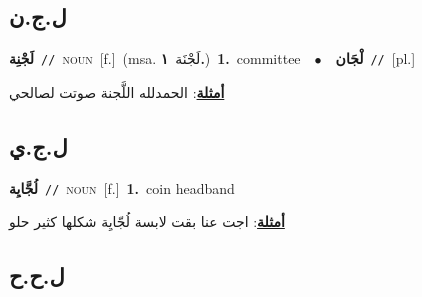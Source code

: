 \documentclass[10pt,a4paper,twoside]{article} %
\begin{document}
\begin{multicols}{2}
{{{{{{{{{{{{{{{{\vspace{-3mm}
\subsection*{\color{blue}\foreignlanguage{arabic}{ل.ج.ن}\color{blue}{}} 

{\setlength\topsep{0pt}\textbf{\foreignlanguage{arabic}{لَجْنِة}}\ {\color{gray}\texttt{//}\color{black}}\ \textsc{noun}\ [f.]\ \color{gray}(msa. \foreignlanguage{arabic}{لَجْنَة}~\foreignlanguage{arabic}{\textbf{١.}})\color{black}\ \textbf{1.}~committee\ \ $\bullet$\ \ \setlength\topsep{0pt}\textbf{\foreignlanguage{arabic}{لْجَان}}\ {\color{gray}\texttt{//}\color{black}}\ [pl.]\  \begin{flushright}\color{gray}\foreignlanguage{arabic}{\textbf{\underline{\foreignlanguage{arabic}{أمثلة}}}: الحمدلله اللَّجنة صوتت لصالحي}\end{flushright}\color{black}} \vspace{2mm}

\vspace{-3mm}
\subsection*{\color{blue}\foreignlanguage{arabic}{ل.ج.ي}\color{blue}{}} 

{\setlength\topsep{0pt}\textbf{\foreignlanguage{arabic}{لُجَّايِة}}\ {\color{gray}\texttt{//}\color{black}}\ \textsc{noun}\ [f.]\ \textbf{1.}~coin headband\  \begin{flushright}\color{gray}\foreignlanguage{arabic}{\textbf{\underline{\foreignlanguage{arabic}{أمثلة}}}: اجت عنا بقت لابسة لُجّايِة شكلها كثير حلو}\end{flushright}\color{black}} \vspace{2mm}

\vspace{-3mm}
\subsection*{\color{blue}\foreignlanguage{arabic}{ل.ح.ح}\color{blue}{}} 

}}}}}}}}}}}}}}}}
\end{multicols}
\end{document}
